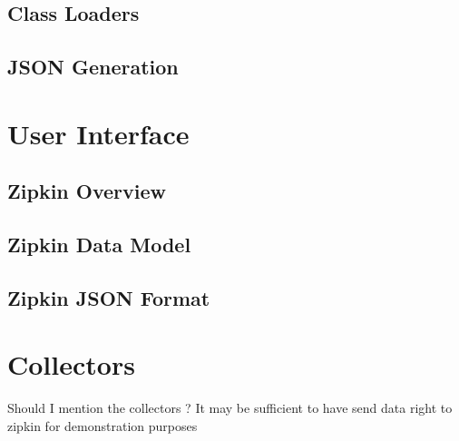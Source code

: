 \subsection{Class Loaders}
\subsection{JSON Generation}
\section{User Interface}
\subsection{Zipkin Overview}
\subsection{Zipkin Data Model}
\subsection{Zipkin JSON Format}
\section{Collectors}
Should I mention the collectors ? It may be sufficient to have send data right to zipkin for demonstration purposes

